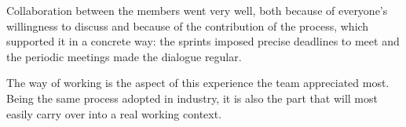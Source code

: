 Collaboration between the members went very well, both because of everyone's willingness to discuss and because of the
contribution of the process, which supported it in a concrete way: the sprints imposed precise deadlines to meet and
the periodic meetings made the dialogue regular.

The way of working is the aspect of this experience the team appreciated most. Being the same process adopted in
industry, it is also the part that will most easily carry over into a real working context.


